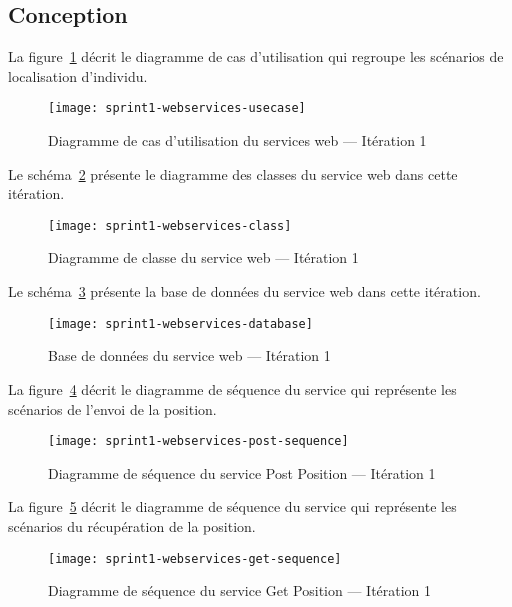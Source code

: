 \subsection{Conception}

La figure~\ref{fig:sprint1-webservices-usecase} décrit le diagramme
de cas d'utilisation qui regroupe les scénarios de localisation d'individu.

\begin{figure}[H]
    \centering
    \texttt{[image: sprint1-webservices-usecase]}
    \caption{Diagramme de cas d'utilisation du services web --- Itération 1}
\label{fig:sprint1-webservices-usecase}
\end{figure}

Le schéma~\ref{fig:sprint1-webservices-class} présente le diagramme des classes
du service web dans cette itération.

\begin{figure}[H]
    \centering
    \texttt{[image: sprint1-webservices-class]}
    \caption{Diagramme de classe du service web --- Itération 1}
\label{fig:sprint1-webservices-class}
\end{figure}

Le schéma~\ref{fig:sprint1-webservices-database} présente la base de données
du service web dans cette itération.

\begin{figure}[H]
    \centering
    \texttt{[image: sprint1-webservices-database]}
    \caption{Base de données du service web --- Itération 1}
\label{fig:sprint1-webservices-database}
\end{figure}

La figure~\ref{fig:sprint1-webservices-post-sequence} décrit le diagramme de
séquence du service  qui représente les scénarios de l'envoi de la position.

\begin{figure}[H]
    \centering
    \texttt{[image: sprint1-webservices-post-sequence]}
    \caption{Diagramme de séquence du service Post Position --- Itération 1}
\label{fig:sprint1-webservices-post-sequence}
\end{figure}

La figure~\ref{fig:sprint1-webservices-get-sequence} décrit le diagramme de
séquence du service  qui représente les scénarios du
récupération de la position.

\begin{figure}[H]
    \centering
    \texttt{[image: sprint1-webservices-get-sequence]}
    \caption{Diagramme de séquence du service Get Position --- Itération 1}
\label{fig:sprint1-webservices-get-sequence}
\end{figure}

